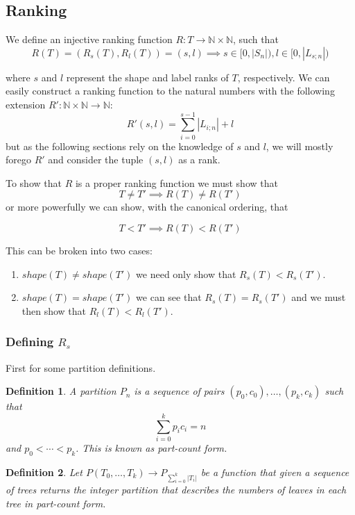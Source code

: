 \documentclass{article}
\newcommand{\halfopen}[2]{[#1, #2)}
\newcommand{\nleaves}[1]{|#1|}
\newcommand{\shape}[1]{shape(#1)}
\newtheorem{definition}{Definition}
\begin{document}
\subsection{Ranking}
We define an injective ranking function $R : T \rightarrow \mathbb{N} \times
\mathbb{N}$, such that
\[
    R(T) = (R_s(T), R_l(T)) = (s, l) \implies
    s \in \halfopen{0}{|S_n|}, l \in \halfopen{0}{|L_{s;n}|}
\]

where $s$ and $l$ represent the shape and label ranks of $T$, respectively.
We can easily construct a ranking function to the natural numbers
with the following extension
$R' : \mathbb{N} \times \mathbb{N} \rightarrow \mathbb{N}$:
\[
    R'(s, l) = \sum_{i=0}^{s - 1} |L_{i;n}| + l
\]
but as the following sections rely on the knowledge of $s$ and $l$, we will
mostly forego $R'$ and consider the tuple $(s, l)$ as a rank.

To show that $R$ is a proper ranking function we must show that
\[
    T \neq T' \implies R(T) \neq R(T')
\]
or more powerfully we can show, with the canonical ordering, that

\[
    T < T' \implies R(T) < R(T')
\]

This can be broken into two cases:
\begin{enumerate}
    \item $\shape{T} \neq \shape{T'}$ we need only show that $R_s(T) < R_s(T')$.
    \item $\shape{T} = \shape{T'}$ we can see that $R_s(T) = R_s(T')$ and we must
        then show that $R_l(T) < R_l(T')$.
\end{enumerate}

\subsubsection{Defining $R_s$}
First for some partition definitions.

\begin{definition}
    A partition $P_n$ is a sequence of pairs $(p_0, c_0), \ldots, (p_k, c_k)$ such
    that
    \[
        \sum_{i=0}^k p_i c_i = n
    \]
    and $p_0 < \cdots < p_k$. This is known as part-count form.
\end{definition}

\begin{definition}
    Let $P(T_0, \ldots, T_k) \rightarrow P_{\sum_{i=0}^k \nleaves{T_i}}$
    be a function that given a sequence of trees returns the integer partition that
    describes the numbers of leaves in each tree in part-count form.
\end{definition}
\end{document}
